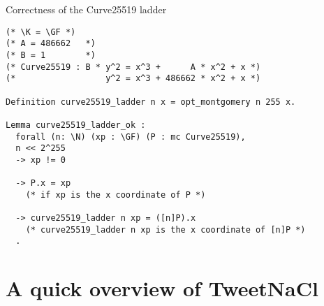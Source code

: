 \documentclass[8pt]{beamer}
\begin{document}
\begin{frame}[fragile]{Correctness of the Curve25519 ladder}
\begin{center}
\begin{lstlisting}[language=Coq, basicstyle=\large]
(* \K = \GF *)
(* A = 486662   *)
(* B = 1        *)
(* Curve25519 : B * y^2 = x^3 +      A * x^2 + x *)
(*                  y^2 = x^3 + 486662 * x^2 + x *)

Definition curve25519_ladder n x = opt_montgomery n 255 x.

Lemma curve25519_ladder_ok :
  forall (n: \N) (xp : \GF) (P : mc Curve25519),
  n << 2^255
  -> xp != 0

  -> P.x = xp
    (* if xp is the x coordinate of P *)

  -> curve25519_ladder n xp = ([n]P).x
    (* curve25519_ladder n xp is the x coordinate of [n]P *)
  .
\end{lstlisting}
\end{center}
\end{frame}

\section{A quick overview of TweetNaCl}
\end{document}
